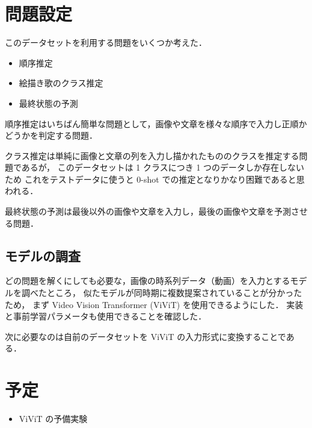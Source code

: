 \documentclass[onecolumn]{ujarticle}   %
\begin{document}
\section{問題設定}
このデータセットを利用する問題をいくつか考えた．

\begin{itemize}
  \item 順序推定
  \item 絵描き歌のクラス推定
  \item 最終状態の予測
\end{itemize}

順序推定はいちばん簡単な問題として，画像や文章を様々な順序で入力し正順かどうかを判定する問題．

クラス推定は単純に画像と文章の列を入力し描かれたもののクラスを推定する問題であるが，
このデータセットは 1 クラスにつき 1 つのデータしか存在しないため
これをテストデータに使うと 0-shot での推定となりかなり困難であると思われる．

最終状態の予測は最後以外の画像や文章を入力し，最後の画像や文章を予測させる問題．

\subsection{モデルの調査}

どの問題を解くにしても必要な，画像の時系列データ（動画）を入力とするモデルを調べたところ，
似たモデルが同時期に複数提案されていることが分かったため，
まず Video Vision Transformer (ViViT) を使用できるようにした．
実装と事前学習パラメータも使用できることを確認した．

次に必要なのは自前のデータセットを ViViT の入力形式に変換することである．

%
%
%
%
%
%
%


\section{予定}
\begin{itemize}
  \item ViViT の予備実験
\end{itemize}



% 
% 
\end{document}
